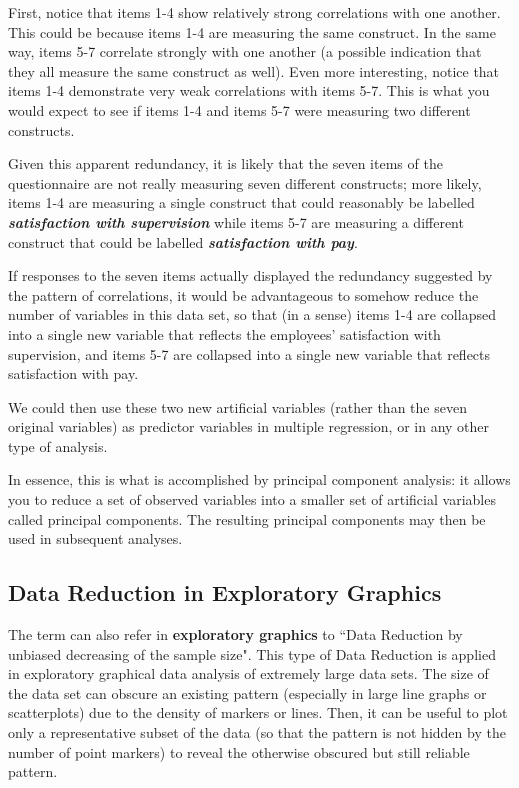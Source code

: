 First, notice that items 1-4 show relatively strong correlations with one another. This
could be because items 1-4 are measuring the same construct. In the same way, items 5-7
correlate strongly with one another (a possible indication that they all measure the same
construct as well). Even more interesting, notice that items 1-4 demonstrate very weak
correlations with items 5-7. This is what you would expect to see if items 1-4 and items 5-7
were measuring two different constructs.

Given this apparent redundancy, it is likely that the seven items of the questionnaire are not
really measuring seven different constructs; more likely, items 1-4 are measuring a single
construct that could reasonably be labelled \textbf{\emph{satisfaction with supervision}} while items 5-7 are
measuring a different construct that could be labelled \textbf{\emph{satisfaction with pay}}.

If responses to the seven items actually displayed the redundancy suggested by the pattern of
correlations, it would be advantageous to somehow reduce the number of variables
in this data set, so that (in a sense) items 1-4 are collapsed into a single new variable that reflects
the employees’ satisfaction with supervision, and items 5-7 are collapsed into a single new
variable that reflects satisfaction with pay.

We could then use these two new artificial variables (rather than the seven original variables) as predictor variables in multiple regression, or in any other type of analysis.

In essence, this is what is accomplished by principal component analysis: it allows you to reduce
a set of observed variables into a smaller set of artificial variables called principal components.
The resulting principal components may then be used in subsequent analyses.
\newpage
\subsection{Data Reduction in Exploratory Graphics}

The term can also refer in \textbf{exploratory graphics} to ``Data Reduction by unbiased decreasing of the sample size". This type of Data Reduction is applied in exploratory graphical data analysis of extremely large data sets. The size of the data set can obscure an existing pattern (especially in large line graphs or scatterplots) due to the density of markers or lines. Then, it can be useful to plot only a representative subset of the data (so that the pattern is not hidden by the number of point markers) to reveal the otherwise obscured but still reliable pattern.

